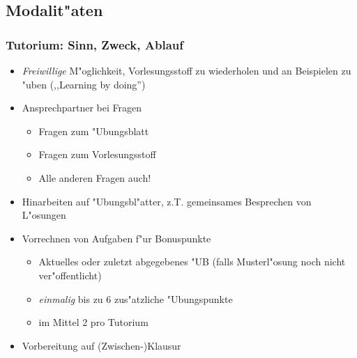 \subsection{Modalit"aten}
\begin{frame}
  \frametitle{Tutorium: Sinn, Zweck, Ablauf}
  \begin{itemize}
    \item \emph{Freiwillige} M"oglichkeit, Vorlesungsstoff zu wiederholen und
          an Beispielen zu "uben (,,Learning by doing'')
    \item Ansprechpartner bei Fragen
      \begin{itemize}
      \item Fragen zum "Ubungsblatt
      \item Fragen zum Vorlesungsstoff
      \item Alle anderen Fragen auch!
      \end{itemize}
    \item Hinarbeiten auf "Ubungsbl"atter, z.T. gemeinsames Besprechen von L"osungen
    \item Vorrechnen von Aufgaben f"ur Bonuspunkte
      \begin{itemize}
      \item Aktuelles oder zuletzt abgegebenes "UB (falls Musterl"osung noch
            nicht ver"offentlicht)
      \item \emph{einmalig} bis zu 6 zus"atzliche "Ubungspunkte
      \item im Mittel 2 pro Tutorium
      \end{itemize}
    \item Vorbereitung auf (Zwischen-)Klausur
  \end{itemize}
\end{frame}

